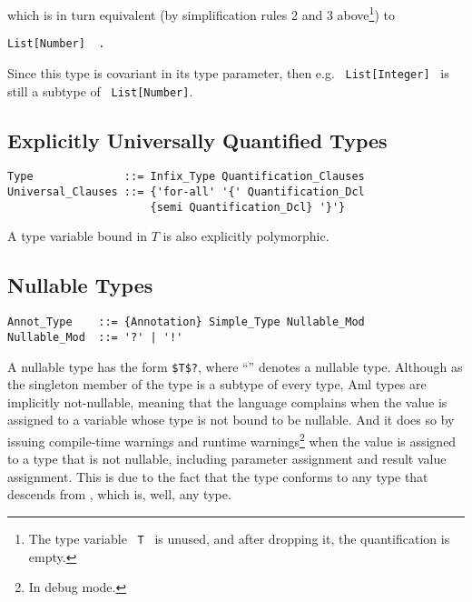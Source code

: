 which is in turn equivalent (by simplification rules 2 and 3 above\footnote{The type variable ~\lstinline!T!~ is unused, and after dropping it, the quantification is empty.}) to
\begin{lstlisting}
List[Number]  .
\end{lstlisting}

Since this  type is covariant in its type parameter, then e.g. ~\lstinline!List[Integer]!~ is still a subtype of ~\lstinline!List[Number]!. 





\subsection{Explicitly Universally Quantified Types}
\label{sec:universal-types}

\syntax\begin{lstlisting}
Type              ::= Infix_Type Quantification_Clauses
Universal_Clauses ::= {'for-all' '{' Quantification_Dcl
                      {semi Quantification_Dcl} '}'}
\end{lstlisting}

A type variable bound in $T$ is also explicitly polymorphic. 





\subsection{Nullable Types}
\label{sec:nullable-types}

\syntax\begin{lstlisting}
Annot_Type    ::= {Annotation} Simple_Type Nullable_Mod
Nullable_Mod  ::= '?' | '!'
\end{lstlisting}

A nullable type has the form \lstinline!$T$?!, where ``'' denotes a nullable type. Although  as the singleton member of the  type is a subtype of every type, Aml types are implicitly not-nullable, meaning that the language complains when the  value is assigned to a variable whose type is not bound to be nullable. And it does so by issuing compile-time warnings and runtime warnings\footnote{In debug mode.} when the  value is assigned to a type that is not nullable, including parameter assignment and result value assignment. This is due to the fact that the type  conforms to any type that descends from , which is, well, any type. 

